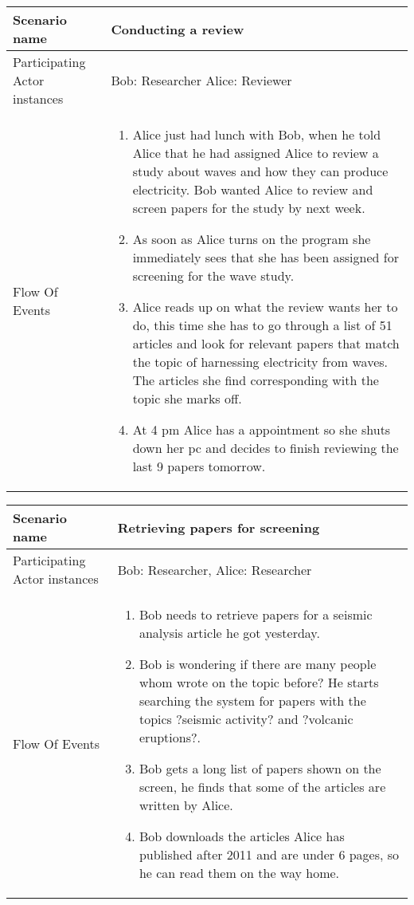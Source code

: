 \begin{center}
	\begin{tabular}{ | l | p{9cm} |} \hline
	    Scenario name & \textbf{Conducting a review}\\ \hline
	    Participating Actor instances &  Bob: Researcher Alice: Reviewer\\ \hline
	    Flow Of Events &
	    \begin{enumerate}
		   \item Alice just had lunch with Bob, when he told Alice that he had assigned Alice to review a study about waves and how they can produce electricity. Bob wanted Alice to review and screen papers for the study by next week.
		   \item As soon as Alice turns on the program she immediately sees that she has been assigned for screening for the wave study.
		   \item Alice reads up on what the review wants her to do, this time she has to go through a list of 51 articles and look for relevant papers that match the topic of harnessing electricity from waves. The articles she find corresponding with the topic she marks off.
		   \item At 4 pm Alice has a appointment so she shuts down her pc and decides to finish reviewing the last 9 papers tomorrow.
	    \end{enumerate}\\ \hline
	\end{tabular}
\end{center}

\hspace{1.5cm}

\begin{center}
	\begin{tabular}{ | l | p{9cm} |} \hline
	    Scenario name & \textbf{Retrieving papers for screening}\\ \hline
	    Participating Actor instances &  Bob: Researcher, Alice: Researcher\\ \hline
	    Flow Of Events &
	    \begin{enumerate}
		    \item Bob needs to retrieve papers for a seismic analysis article he got yesterday.
		    \item Bob is wondering if there are many people whom wrote on the topic before? He starts searching the system for papers with the topics ?seismic activity? and ?volcanic eruptions?.
		    \item Bob gets a long list of papers shown on the screen, he finds that some of the articles are written by Alice.
		    \item Bob downloads the articles Alice has published after 2011 and are under 6 pages, so he can read them on the way home.
		    
	    \end{enumerate}\\ \hline
	\end{tabular}
\end{center}

